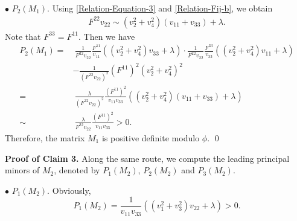 \documentclass[11pt]{amsart}
\numberwithin{theorem}{section}
\numberwithin{equation}{section}
\begin{document}
$\bullet$ $P_2(M_1)$. Using \eqref{Relation-Equation-3} and \eqref{Relation-Fij-b}, we obtain 
\begin{align}\label{Relation-F22v22}
F^{22}v_{22}\sim(v_2^2+v_4^2)(v_{11}+v_{33})+\lambda. 
\end{align} 
Note that $F^{33}=F^{11}$. Then we have
\begin{align*}
P_2(M_1)=&~\frac{1}{F^{22}v_{22}}\frac{F^{11}}{v_{11}}\left((v_2^2+v_4^2)v_{33}+\lambda\right)\cdot\frac{1}{F^{22}v_{22}}\frac{F^{33}}{v_{33}}\left((v_2^2+v_4^2)v_{11}+\lambda\right)\\
&-\frac{1}{(F^{22}v_{22})^2}(F^{11})^2(v_2^2+v_4^2)^2\\
=&~\frac{\lambda}{(F^{22}v_{22})^2}\frac{(F^{11})^2}{v_{11}v_{33}}\left((v_2^2+v_4^2)(v_{11}+v_{33})+\lambda\right)\\
\sim&~\frac{\lambda}{F^{22}v_{22}}\frac{(F^{11})^2}{v_{11}v_{33}}>0.
\end{align*}
Therefore, the matrix $M_1$ is positive definite modulo $\phi$. \qed

\vspace{0.4cm}\textbf{Proof of Claim 3.} Along the same route, we compute the leading principal minors of $M_2$, denoted by $P_1(M_2)$,  $P_2(M_2)$ and  $P_3(M_2)$.

$\bullet$ $P_1(M_2)$. Obviously, $$P_1(M_2)=\frac{1}{v_{11}v_{33}} \left((v_1^2+v_3^2)v_{22}+\lambda\right)>0. $$
\end{document}

